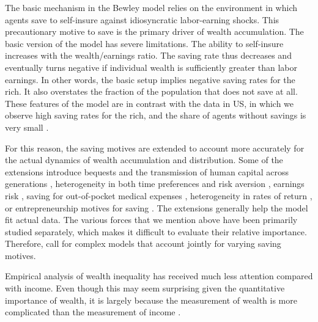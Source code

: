 \begin{refsection}
The basic mechanism in the Bewley model relies on the environment in which agents save to self-insure against idiosyncratic labor-earning shocks. This precautionary motive to save is the primary driver of wealth accumulation. The basic version of the model has severe limitations. The ability to self-insure increases with the wealth/earnings ratio. The saving rate thus decreases and eventually turns negative if individual wealth is sufficiently greater than labor earnings. In other words, the basic setup implies negative saving rates for the rich. It also overstates the fraction of the population that does not save at all. These features of the model are in contrast with the data in \ac{US}, in which we observe high saving rates for the rich, and the share of agents without savings is very small \parencite{DENARDI2017280}. 

For this reason, the saving motives are extended to account more accurately for the actual dynamics of wealth accumulation and distribution. Some of the extensions introduce bequests and the transmission of human capital across generations \parencite{nardi2004wealth,de2014bequests}, heterogeneity in both time preferences and risk aversion \parencite{HENDRICKS2007}, earnings risk \parencite{castaneda2003}, saving for out-of-pocket medical expenses \parencite{kopecky2014impact}, heterogeneity in rates of return \parencite{lusardi2017optimal,BENHABIB2015489}, or entrepreneurship motives for saving \parencite{cagetti2006entrepreneurship}. The extensions generally help the model fit actual data. The various forces that we mention above have been primarily studied separately, which makes it difficult to evaluate their relative importance. Therefore, \textcite{DENARDI2017280} call for complex models that account jointly for varying saving motives.

Empirical analysis of wealth inequality has received much less attention compared with income. Even though this may seem surprising given the quantitative importance of wealth, it is largely because the measurement of wealth is more complicated than the measurement of income \parencite{zucman2018}.


\end{refsection}
